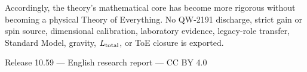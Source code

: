 \documentclass[11pt,a4paper]{article}
\begin{document}
Accordingly, the theory's mathematical core has become more rigorous without becoming a physical Theory of Everything. No QW-2191 discharge, strict gain or spin source, dimensional calibration, laboratory evidence, legacy-role transfer, Standard Model, gravity, $L_{\rm total}$, or ToE closure is exported.

\vfill
\begin{center}
\small Release 10.59 --- English research report --- CC BY 4.0
\end{center}
\end{document}

